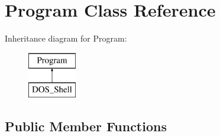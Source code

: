 \hypertarget{classProgram}{\section{Program Class Reference}
\label{classProgram}
}
Inheritance diagram for Program\-:\begin{figure}[H]
\begin{center}
\leavevmode
\includegraphics[height=2.000000cm]{classProgram}
\end{center}
\end{figure}
\subsection*{Public Member Functions}
